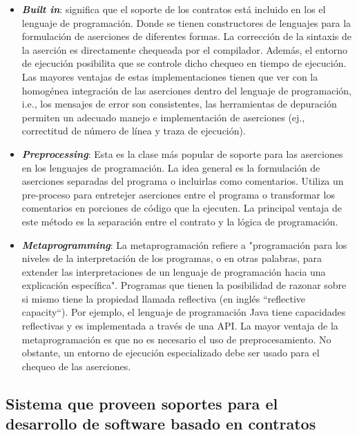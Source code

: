 \begin{itemize}

 \item \textbf{\textit{Built in}}: significa que el soporte de los contratos está incluido en los el lenguaje de programación. Donde se tienen constructores de lenguajes para la formulación de aserciones de diferentes formas. La corrección de la sintaxis de la aserción es directamente chequeada por el compilador. Además, el entorno de ejecución posibilita que se controle dicho chequeo en tiempo de ejecución. Las mayores ventajas de estas implementaciones tienen que ver con la homogénea integración de las aserciones dentro del lenguaje de programación, i.e., los mensajes de error son consistentes, las herramientas de depuración permiten un adecuado manejo e implementación de aserciones (ej., correctitud de número de línea y traza de ejecución).


\item \textbf{\textit{Preprocessing}}: Esta es la clase más popular de soporte para las aserciones en los lenguajes de programación. La idea general es la formulación de aserciones separadas del programa o incluirlas como comentarios. Utiliza un pre-proceso para entretejer aserciones entre el programa o transformar los comentarios en porciones de código que la ejecuten. La principal ventaja de este método es la separación entre el contrato y la lógica de programación.


\item \textbf{\textit{Metaprogramming}}: La metaprogramación refiere a "programación para los niveles de la interpretación de los programas, o en otras palabras, para extender las interpretaciones de un lenguaje de programación hacia una explicación específica"\cite{Temp1}.
Programas que tienen la posibilidad de razonar sobre si mismo tiene la propiedad llamada reflectiva (en inglés ``reflective capacity``). Por ejemplo, el lenguaje de programación Java tiene capacidades reflectivas y es implementada a través de una API. La mayor ventaja de la metaprogramación es que no es necesario el uso de preprocesamiento. No obstante, un entorno de ejecución especializado debe ser usado para el chequeo de las aserciones.
\end{itemize}

\subsection{Sistema que proveen soportes para el desarrollo de software basado en contratos} \label{sec:sistemasca}

